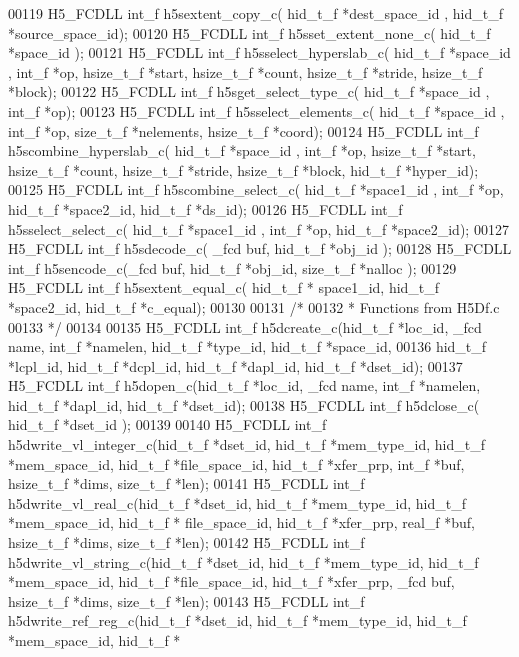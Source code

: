 \begin{DoxyCode}
00119 H5\_FCDLL int\_f h5sextent\_copy\_c( hid\_t\_f *dest\_space\_id , hid\_t\_f *source\_space\_id);
00120 H5\_FCDLL int\_f h5sset\_extent\_none\_c( hid\_t\_f *space\_id );
00121 H5\_FCDLL int\_f h5sselect\_hyperslab\_c( hid\_t\_f *space\_id , int\_f *op, hsize\_t\_f *start, hsize\_t\_f *count, 
      hsize\_t\_f *stride, hsize\_t\_f *block);
00122 H5\_FCDLL int\_f h5sget\_select\_type\_c( hid\_t\_f *space\_id , int\_f *op);
00123 H5\_FCDLL int\_f h5sselect\_elements\_c( hid\_t\_f *space\_id , int\_f *op, size\_t\_f *nelements, hsize\_t\_f *coord);
00124 H5\_FCDLL int\_f h5scombine\_hyperslab\_c( hid\_t\_f *space\_id , int\_f *op, hsize\_t\_f *start, hsize\_t\_f *count, 
      hsize\_t\_f *stride, hsize\_t\_f *block, hid\_t\_f *hyper\_id);
00125 H5\_FCDLL int\_f h5scombine\_select\_c( hid\_t\_f *space1\_id , int\_f *op, hid\_t\_f *space2\_id, hid\_t\_f *ds\_id);
00126 H5\_FCDLL int\_f h5sselect\_select\_c( hid\_t\_f *space1\_id , int\_f *op, hid\_t\_f *space2\_id);
00127 H5\_FCDLL int\_f h5sdecode\_c( \_fcd buf, hid\_t\_f *obj\_id );
00128 H5\_FCDLL int\_f h5sencode\_c(\_fcd buf, hid\_t\_f *obj\_id, size\_t\_f *nalloc );
00129 H5\_FCDLL int\_f h5sextent\_equal\_c( hid\_t\_f * space1\_id, hid\_t\_f *space2\_id, hid\_t\_f *c\_equal);
00130 
00131 \textcolor{comment}{/*}
00132 \textcolor{comment}{ * Functions from H5Df.c}
00133 \textcolor{comment}{ */}
00134 
00135 H5\_FCDLL int\_f h5dcreate\_c(hid\_t\_f *loc\_id, \_fcd name, int\_f *namelen, hid\_t\_f *type\_id, hid\_t\_f *space\_id,
00136                  hid\_t\_f *lcpl\_id, hid\_t\_f *dcpl\_id, hid\_t\_f *dapl\_id, hid\_t\_f *dset\_id);
00137 H5\_FCDLL int\_f h5dopen\_c(hid\_t\_f *loc\_id, \_fcd name, int\_f *namelen, hid\_t\_f *dapl\_id, hid\_t\_f *dset\_id);
00138 H5\_FCDLL int\_f h5dclose\_c( hid\_t\_f *dset\_id );
00139 
00140 H5\_FCDLL int\_f h5dwrite\_vl\_integer\_c(hid\_t\_f *dset\_id, hid\_t\_f *mem\_type\_id, hid\_t\_f *mem\_space\_id, hid\_t\_f
       *file\_space\_id, hid\_t\_f *xfer\_prp, int\_f *buf, hsize\_t\_f *dims, size\_t\_f *len);
00141 H5\_FCDLL int\_f h5dwrite\_vl\_real\_c(hid\_t\_f *dset\_id, hid\_t\_f *mem\_type\_id, hid\_t\_f *mem\_space\_id, hid\_t\_f *
      file\_space\_id, hid\_t\_f *xfer\_prp, real\_f *buf, hsize\_t\_f *dims, size\_t\_f *len);
00142 H5\_FCDLL int\_f h5dwrite\_vl\_string\_c(hid\_t\_f *dset\_id, hid\_t\_f *mem\_type\_id, hid\_t\_f *mem\_space\_id, hid\_t\_f 
      *file\_space\_id, hid\_t\_f *xfer\_prp, \_fcd buf, hsize\_t\_f *dims, size\_t\_f *len);
00143 H5\_FCDLL int\_f h5dwrite\_ref\_reg\_c(hid\_t\_f *dset\_id, hid\_t\_f *mem\_type\_id, hid\_t\_f *mem\_space\_id, hid\_t\_f *

\end{DoxyCode}

